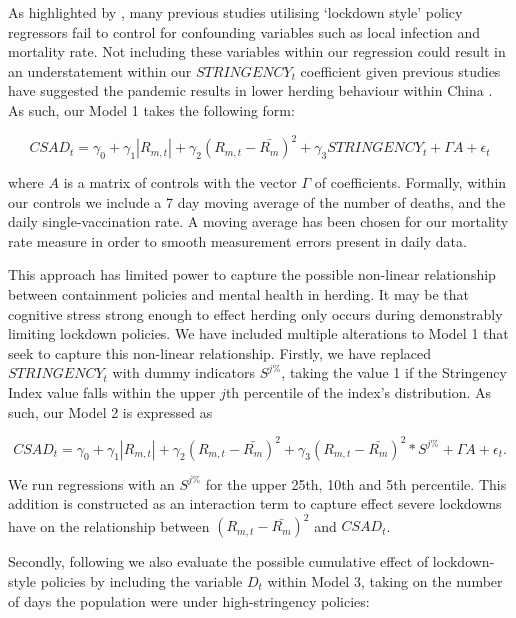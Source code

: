 \documentclass[12pt]{article}
\numberwithin{table}{section}   %
\begin{document}
As highlighted by \citet{aknin}, many previous studies utilising ‘lockdown style’ policy regressors fail to control for confounding variables such as local infection and mortality rate. Not including these variables within our regression could result in an understatement within our $STRINGENCY_t$ coefficient given previous studies have suggested the pandemic results in lower herding behaviour within China \citep{wu}. As such, our Model 1 takes the following form:

\begin{equation}\label{model-2}
CSAD_t=\gamma_0+\gamma_1 |R_{m,t}|+\gamma_2 (R_{m,t}-\bar{R_m})^2+\gamma_3STRINGENCY_t+\Gamma{A}+\epsilon_t
\end{equation}

where $A$ is a matrix of controls with the vector $\Gamma$ of coefficients. Formally, within our controls we include a 7 day moving average of the number of deaths, and the daily single-vaccination rate. A moving average has been chosen for our mortality rate measure in order to smooth measurement errors present in daily data.

This approach has limited power to capture the possible non-linear relationship between containment policies and mental health in herding. It may be that cognitive stress strong enough to effect herding only occurs during demonstrably limiting lockdown policies. We have included multiple alterations to Model 1 that seek to capture this non-linear relationship. Firstly, we have replaced $STRINGENCY_t$ with dummy indicators $S^{j\%}$, taking the value 1 if the Stringency Index value falls within the upper $j$th percentile of the index’s distribution. As such, our Model 2 is expressed as

\begin{equation}\label{model-3}
CSAD_t=\gamma_0+\gamma_1 |R_{m,t}|+\gamma_2 (R_{m,t}-\bar{R_m})^2+\gamma_3(R_{m,t}-\bar{R_m})^2*S^{j\%}+\Gamma{A}+\epsilon_t.
\end{equation}

We run regressions with an $S^{j\%}$ for the upper 25th, 10th and 5th percentile. This addition is constructed as an interaction term to capture effect severe lockdowns have on the relationship between $(R_{m,t}-\bar{R_m})^2$ and $CSAD_t$.

Secondly, following \citet{aknin} we also evaluate the possible cumulative effect of lockdown-style policies by including the variable $D_t$ within Model 3, taking on the number of days the population were under high-stringency policies:
\end{document}
